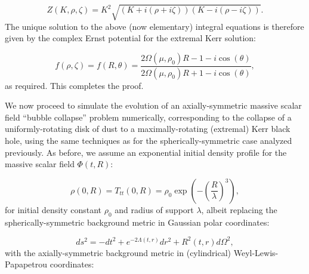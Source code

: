 \documentclass{article}
\begin{document}
\begin{equation}
Z \left( K, \rho, \zeta \right) = K^2 \sqrt{\left( K + i \left( \rho + i \zeta \right) \right) \left( K - i \left( \rho - i \zeta \right) \right)}.
\end{equation}
The unique solution to the above (now elementary) integral equations is therefore given by the complex Ernst potential for the extremal Kerr solution:

\begin{equation}
f \left( \rho, \zeta \right) = f \left( R, \theta \right) = \frac{2 \Omega \left( \mu, \rho_0 \right) R - 1 - i \cos \left( \theta \right)}{2 \Omega \left( \mu, \rho_0 \right) R + 1 - i \cos \left( \theta \right)},
\end{equation}
as required. This completes the proof.

We now proceed to simulate the evolution of an axially-symmetric massive scalar field ``bubble collapse'' problem numerically, corresponding to the collapse of a uniformly-rotating disk of dust to a maximally-rotating (extremal) Kerr black hole, using the same techniques as for the spherically-symmetric case analyzed previously. As before, we assume an exponential initial density profile for the massive scalar field ${\Phi \left( t, R\right)}$:

\begin{equation}
\rho \left( 0, R \right) = T_{t t} \left( 0, R \right) = \rho_0 \exp \left( - \left( \frac{R}{\lambda} \right)^3 \right),
\end{equation}
for initial density constant ${\rho_0}$ and radius of support ${\lambda}$, albeit replacing the spherically-symmetric background metric in Gaussian polar coordinates:

\begin{equation}
d s^2 = - d t^2 + e^{- 2 \Lambda \left( t, r \right)} d r^2 + R^2 \left( t, r \right) d \Omega^2,
\end{equation}
with the axially-symmetric background metric in (cylindrical) Weyl-Lewis-Papapetrou coordinates:
\end{document}
